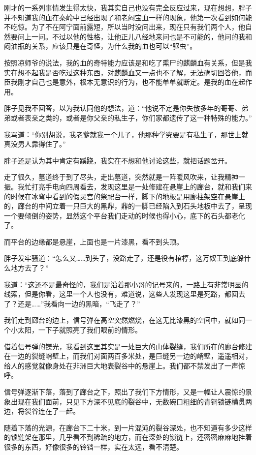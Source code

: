 刚才的一系列事情发生得太快，我其实自己也没有完全反应过来，现在想想，胖子并不知道我的血在秦岭中已经出现了和老闷宝血一样的现象，他第一次看到如何能不吃惊。为了不在阿宁面前露短，所以当时没问出来，现在只有我们两个人，他自然要问上一问。不过以他的性格，让他正儿八经地来问也是不可能的，他问的我和闷油瓶的关系，应该只是在奇怪，为什么我的血也可以“驱虫”。

按照凉师爷的说法，我的血的奇特能力应该是和吃了熏尸的麒麟血有关系，但是我实在想不起我是否吃过这种东西，对麒麟血又一点也不了解，无法确切回答他，而臣我刚才自己也是意外，根本无意识的行为，也不能单单就断定。是我的血在起作用。

胖子见我不回答，以为我认同他的想法，道：“他说不定是你失散多年的哥哥、弟弟或者表亲之类的，或者是你父亲的私生子，你们家都遗传了这一种特殊的能力。”

我骂道：“你别胡说，我老爹就我一个儿子，他那种学究要是有私生子，那世上就真没男人靠得住了。”

胖子还是认为其中肯定有蹊跷，我实在不想和他讨论这些，就把话题岔开。

走了很久，墓道终于到了尽头，走出墓道，突然就是一阵暖风吹来，让我精神一振。我忙打亮手电向四周看去，发现这里是一处修建在悬崖上的廊台，就和我们来的时候在冰穹中看到的假灵宫的祭祀台一样，脚下的地板是用廊柱架空在悬崖上的，廊台的中间立着一只巨大的黑鼎，鼎的一脚已经陷入到石头地板中去了，呈现一个要倾倒的姿势，显然这个平台我们走动的时候也得小心，底下的石头都老化了。

而平台的边缘都是悬崖，上面也是一片漆黑，看不到头顶。

胖子发牢骚道：“怎么又……到头了，没路走了，还是役有棺椁，这万奴王到底躲什么地方去了？”

我道：“这还不是最奇怪的，我们是沿着那小哥的记号来的，一路上有非常明显的线索，但是你看，这里一个人也没有，难道说，这些人发现这里是死路，都回去了？还是……”我看向一边的黑暗，“飞走了？”

我们走到廊台的边上，信号弹在高空突然燃烧，在这无比漆黑的空间中，就如同一个小太阳，一下子就照亮了我们眼前的情形。

借着信号弹的镁光，我看到这里其实是一处巨大的山体裂缝，我们所在的廊台修建在一边的裂缝峭壁上，而我们对面两百多米处，是巨缝另一边的峭壁，遥遥相对，给人的感觉就像身处在非洲巨大地表裂谷中的悬崖上。我们都不禁发出了一声惊呼。

信号弹逐渐下落，落到了廊台之下，照出了我们下方情形，又是一幅让人震惊的景象出现在我们面前，只见下方深不见底的裂谷中，无数碗口粗细的青铜锁链横贯两边，将裂谷连在了一起。

随着下落的光源，在廊台下二十米，到一片混沌的裂谷深处，也不知道有多少这样的锁链架在那里，几乎看不到稀疏的地方，而在深处的锁链上，还密密麻麻地挂着很多的东西，好像很多的铃铛一样，实在太远，看不清楚。

